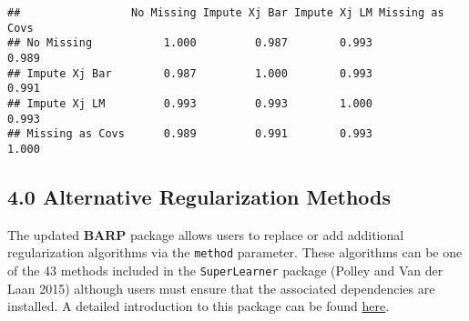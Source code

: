 \documentclass[]{article}
\newenvironment{Shaded}{\begin{snugshade}}{\end{snugshade}}
\newcommand{\KeywordTok}[1]{\textcolor[rgb]{0.13,0.29,0.53}{\textbf{#1}}}
\newcommand{\DecValTok}[1]{\textcolor[rgb]{0.00,0.00,0.81}{#1}}
\newcommand{\StringTok}[1]{\textcolor[rgb]{0.31,0.60,0.02}{#1}}
\newcommand{\OperatorTok}[1]{\textcolor[rgb]{0.81,0.36,0.00}{\textbf{#1}}}
\newcommand{\NormalTok}[1]{#1}
\begin{document}
\begin{Shaded}
\end{Shaded}

\begin{verbatim}
##                 No Missing Impute Xj Bar Impute Xj LM Missing as Covs
## No Missing           1.000         0.987        0.993           0.989
## Impute Xj Bar        0.987         1.000        0.993           0.991
## Impute Xj LM         0.993         0.993        1.000           0.993
## Missing as Covs      0.989         0.991        0.993           1.000
\end{verbatim}

\subsection{4.0 Alternative Regularization
Methods}\label{alternative-regularization-methods}

The updated \textbf{BARP} package allows users to replace or add
additional regularization algorithms via the \texttt{method} parameter.
These algorithms can be one of the 43 methods included in the
\texttt{SuperLearner} package (Polley and Van der Laan 2015) although
users must ensure that the associated dependencies are installed. A
detailed introduction to this package can be found
\href{https://cran.r-project.org/web/packages/SuperLearner/vignettes/Guide-to-SuperLearner.html}{here}.
\end{document}
